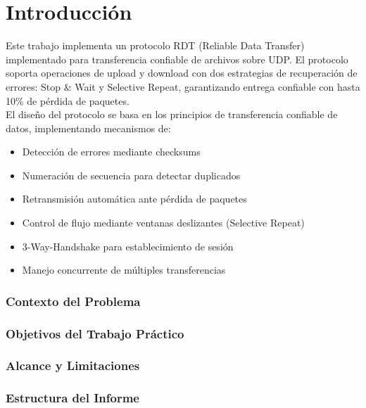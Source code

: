 \section{Introducción}
Este trabajo implementa un protocolo RDT (Reliable Data Transfer) implementado para transferencia confiable de archivos sobre UDP. El protocolo soporta operaciones de upload y download con dos estrategias de recuperación de errores: Stop \& Wait y Selective Repeat, garantizando entrega confiable con hasta 10\% de pérdida de paquetes.
\\

El diseño del protocolo se basa en los principios de transferencia confiable de datos, implementando mecanismos de:
\begin{itemize}
    \item Detección de errores mediante checksums
    \item Numeración de secuencia para detectar duplicados
    \item Retransmisión automática ante pérdida de paquetes
    \item Control de flujo mediante ventanas deslizantes (Selective Repeat)
    \item 3-Way-Handshake para establecimiento de sesión
    \item Manejo concurrente de múltiples transferencias
\end{itemize}

\subsubsection*{Contexto del Problema}
\subsubsection*{Objetivos del Trabajo Práctico}
\subsubsection*{Alcance y Limitaciones}
\subsubsection*{Estructura del Informe}